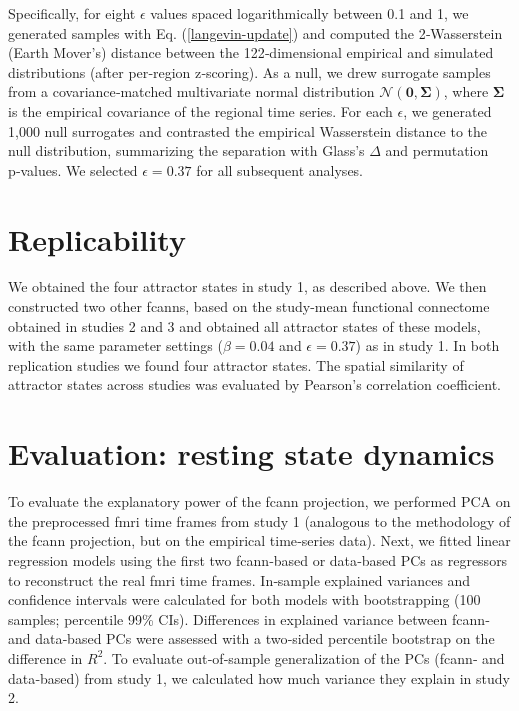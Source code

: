 \documentclass{article}
\begin{document}
Specifically, for eight $\epsilon$ values spaced logarithmically between 0.1 and 1, we generated samples with Eq. (\ref{langevin-update}) and computed the 2‑Wasserstein (Earth Mover's) distance between the 122‑dimensional empirical and simulated distributions (after per‑region z‑scoring). As a null, we drew surrogate samples from a covariance‑matched multivariate normal distribution $\mathcal{N}(\boldsymbol{0}, \boldsymbol{\Sigma})$, where $\boldsymbol{\Sigma}$ is the empirical covariance of the regional time series. For each $\epsilon$, we generated 1,000 null surrogates and contrasted the empirical Wasserstein distance to the null distribution, summarizing the separation with Glass's $\Delta$ and permutation p‑values. We selected $\epsilon = 0.37$ for all subsequent analyses.

\section{Replicability}

We obtained the four attractor states in study 1, as described above. We then constructed two other \acrshort{fcann}s, based on the study-mean functional connectome obtained in studies 2 and 3 and  obtained all attractor states of these models, with the same parameter settings ($\beta = 0.04$ and $\epsilon = 0.37$) as in study 1. In both replication studies we found four attractor states. The spatial similarity of attractor states across studies was evaluated by Pearson's correlation coefficient.

\section{Evaluation: resting state dynamics}

To evaluate the explanatory power of the \acrshort{fcann} projection, we performed PCA on the preprocessed \acrshort{fmri} time frames from study 1 (analogous to the methodology of the \acrshort{fcann} projection, but on the empirical time‑series data).
Next, we fitted linear regression models using the first two \acrshort{fcann}‑based or data‑based PCs as regressors to reconstruct the real \acrshort{fmri} time frames. In‑sample explained variances and confidence intervals were calculated for both models with bootstrapping (100 samples; percentile 99\% CIs). Differences in explained variance between \acrshort{fcann}‑ and data‑based PCs were assessed with a two‑sided percentile bootstrap on the difference in $R^2$. To evaluate out‑of‑sample generalization of the PCs (\acrshort{fcann}‑ and data‑based) from study 1, we calculated how much variance they explain in study 2.
\end{document}
